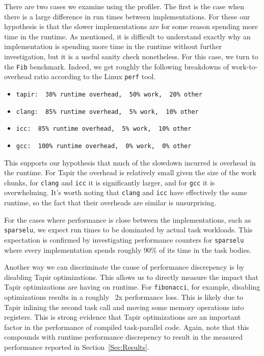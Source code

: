\documentclass[sigconf]{acmart}
\begin{document}
There are two cases we examine using the profiler. The first is the case when
there is a large difference in run times between implementations. For these our
hypothesis is that the slower implementations are for some reason spending more
time in the runtime. As mentioned, it is difficult to understand exactly why an
implementation is spending more time in the runtime without further
investigation, but it is a useful sanity check nonetheless. For this case, we
turn to the \texttt{Fib} benchmark.  Indeed, we get roughly the following
breakdowns of work-to-overhead ratio according to the Linux \texttt{perf} tool.
\begin{itemize}
\item \texttt{tapir: ~30\% runtime overhead, ~50\% work, ~20\% other}
\item \texttt{clang: ~85\% runtime overhead, ~5\% work, ~10\% other}
\item \texttt{icc: ~85\% runtime overhead, ~5\% work, ~10\% other}
\item \texttt{gcc: ~100\% runtime overhead, ~0\% work, ~0\% other}
\end{itemize}
This supports our hypothesis that much of the slowdown incurred is overhead in
the runtime. For Tapir the overhead is relatively small given the size of the
work chunks, for \texttt{clang} and \texttt{icc} it is significantly larger,
and for \texttt{gcc} it is overwhelming. It's worth noting that \texttt{clang}
and \texttt{icc} have effectively the same runtime, so the fact that their
overheads are similar is unsurprising.

For the cases where performance is close between the implementations, such as
\texttt{sparselu}, we expect run times to be dominated by actual task workloads. This
expectation is confirmed by investigating performance counters for \texttt{sparselu}
where every implementation spends roughly 90\% of its time in the task
bodies.

Another way we can discriminate the cause of performance discrepency is by disabling
Tapir optimizations. This allows us to directly measure the impact that Tapir
optimizations are having on runtime. For \texttt{fibonacci}, for example,
disabling optimizations results in a roughly ~2x performance loss. This is
likely due to Tapir inlining the second task call and moving some memory
operations into registers. This is strong evidence that Tapir optimizations are
an important factor in the performance of compiled task-parallel code. Again,
note that this compounds with runtime performance discrepency to result in the
measured performance reported in Section~\ref{Sec:Results}.
\end{document}
